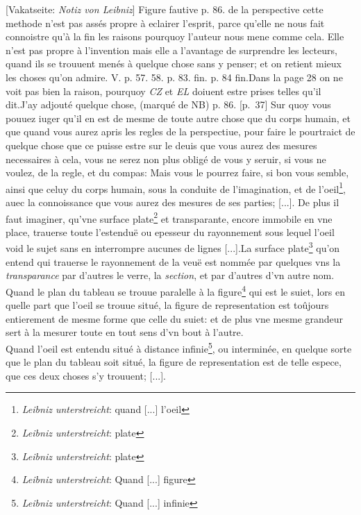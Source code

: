                 \vspace*{8mm}
                \pstart 
                \normalsize
          [Vakatseite: \textit{Notiz von Leibniz}] Figure fautive p. 86. de la perspective  cette methode n'est pas ass\'{e}s propre \`{a} eclairer l'esprit, parce qu'elle ne nous fait connoistre qu'\`{a} la fin les raisons pourquoy l'auteur nous mene comme cela. Elle n'est pas  propre \`{a} l'invention mais elle a l'avantage de surprendre les lecteurs, quand ils se trouuent men\'{e}s \`{a} quelque chose sans y penser; et on retient mieux les choses qu'on admire. V. p. 57. 58. p. 83. fin. p. 84 fin.\pend \pstart  Dans la page 28 on ne voit pas bien  la raison, pourquoy \textit{CZ} et \textit{EL} doiuent estre prises telles qu'il dit.\pend \pstart J'ay adjout\'{e} quelque chose, (marqu\'{e} de NB) p. 86.\pend
          \pstart \hspace{2mm} [p.~37] Sur quoy vous pouuez iuger qu'il en est de mesme de toute autre chose que du corps humain, et que quand vous aurez apris les regles de la perspectiue, pour faire le pourtraict de quelque chose que ce puisse estre sur le deuis que vous aurez des mesures necessaires \`{a} cela, vous ne serez non plus oblig\'{e} de vous y seruir, si vous ne voulez, de la regle, et du compas: Mais vous le pourrez faire, si bon vous semble, ainsi que celuy du corps humain, sous la conduite de l'imagination, et de l'oeil\footnote{\textit{Leibniz unterstreicht}: quand [...] l'oeil}, auec la connoissance que vous aurez des mesures de ses parties; [...].\pend
          \pstart [p.~45] De plus il faut imaginer, qu'vne surface plate\footnote{\textit{Leibniz unterstreicht}: plate} et transparante, encore immobile en vne place, trauerse toute l'estendu\"{e} ou epesseur du rayonnement sous lequel l'oeil\protect{} void le sujet sans en interrompre aucunes de lignes [...].\pend \pstart  La surface plate\footnote{\textit{Leibniz unterstreicht}: plate} qu'on entend qui trauerse le rayonnement de la veu\"{e} est nomm\'{e}e par quelques vns la \textit{transparance} par d'autres le verre\protect{}, la \textit{section}, et par d'autres d'vn autre nom.\pend
          \pstart [p.~55] Quand le plan du tableau se trouue paralelle \`{a} la figure\footnote{\textit{Leibniz unterstreicht}: Quand [...] figure} qui est le suiet, lors en quelle part que l'oeil\protect{} se trouue situ\'{e}, la figure de representation est to\^{u}jours entierement de mesme forme que celle du suiet: et de plus vne mesme grandeur sert \`{a} la mesurer toute en tout sens d'vn bout \`{a} l'autre.\\Quand l'oeil\protect{} est entendu situ\'{e} \`{a} distance infinie\footnote{\textit{Leibniz unterstreicht}: Quand [...] infinie}, ou intermin\'{e}e, en quelque sorte que le plan du tableau soit situ\'{e}, la figure de representation est de telle espece, que ces deux choses s'y trouuent; [...].\pend
